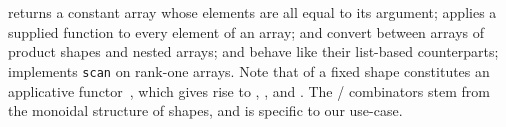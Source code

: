 \begin{code}
\AgdaSpace{}%
\AgdaSpace{}%
\AgdaSymbol{(}\AgdaSpace{}%
\AgdaSpace{}%
\AgdaSymbol{)}\AgdaSpace{}%
\AgdaSpace{}%
\AgdaSpace{}%
\AgdaSpace{}%
\AgdaSpace{}%
\AgdaSpace{}%
\AgdaSpace{}%
\AgdaSpace{}%
\<%
\\
%
\>[6]%
\>[15]\AgdaSymbol{:}\AgdaSpace{}%
\AgdaSymbol{(}\AgdaSpace{}%
\AgdaSpace{}%
\AgdaSpace{}%
\AgdaSpace{}%
\AgdaSymbol{)}\AgdaSpace{}%
\AgdaSpace{}%
\AgdaSpace{}%
\AgdaSpace{}%
\AgdaSpace{}%
\AgdaSpace{}%
\AgdaSpace{}%
\AgdaSpace{}%
\AgdaSpace{}%
\AgdaSpace{}%
\AgdaSpace{}%
\AgdaSpace{}%
\<%
\\
%
\>[6]%
\>[15]\AgdaSymbol{:}\AgdaSpace{}%
\AgdaSymbol{(}\AgdaSpace{}%
\AgdaSpace{}%
\AgdaSpace{}%
\AgdaSpace{}%
\AgdaSymbol{)}\AgdaSpace{}%
\AgdaSpace{}%
\AgdaSpace{}%
\AgdaSpace{}%
\AgdaSpace{}%
\AgdaSymbol{(}\AgdaSpace{}%
\AgdaSymbol{)}\AgdaSpace{}%
\AgdaSpace{}%
\AgdaSpace{}%
\AgdaSpace{}%
\AgdaSpace{}%
\AgdaSpace{}%
\AgdaSymbol{(}\AgdaSpace{}%
\AgdaSymbol{)}\AgdaSpace{}%
\<%
\end{code}
 returns a constant array whose elements are all equal to its argument;
 applies a supplied function to every element of an array;
 and  convert between arrays of product shapes and
nested arrays;  and  behave like their list-based
counterparts;  implements \texttt{scan} on rank-one arrays.
Note that  of a fixed shape constitutes an applicative
functor~\citep{MCBRIDE_PATERSON_2008}, which gives rise to , ,
 and .  The / combinators stem from
the monoidal structure of shapes, and  is specific to our use-case.

